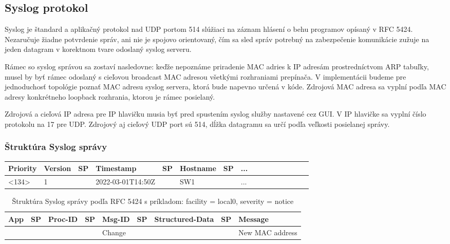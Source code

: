 \documentclass[12pt, a4paper]{article}
\begin{document}
\subsection{Syslog protokol}
Syslog je štandard a aplikačný protokol nad UDP portom 514 slúžiaci na záznam hlásení o behu programov opísaný v RFC 5424.
Nezaručuje žiadne potvrdenie správ, ani nie je spojovo orientovaný, čím sa sled správ potrebný na zabezpečenie
komunikácie zužuje na jeden datagram v korektnom tvare odoslaný syslog serveru.

Rámec so syslog správou sa zostaví nasledovne: keďže nepoznáme priradenie MAC adries k IP adresám prostredníctvom ARP tabuľky, musel by 
byť rámec odoslaný s cieľovou broadcast MAC adresou všetkými rozhraniami prepínača. V implementácii budeme pre jednoduchosť topológie
poznať MAC adresu syslog servera, ktorá bude napevno určená v kóde. Zdrojová MAC adresa sa vyplní podľa MAC adresy konkrétneho loopback rozhrania, ktorou je rámec posielaný.

Zdrojová a cieľová IP adresa pre IP hlavičku musia byť pred spustením syslog služby nastavené cez GUI. V IP hlavičke sa vyplní
číslo protokolu na 17 pre UDP. Zdrojový aj cieľový UDP port sú 514, dĺžka datagramu sa určí podľa veľkosti posielanej správy.

\subsubsection{Štruktúra Syslog správy}
\begin{table}[]
\begin{tabular}{|l|l|l|l|l|l|l|l|l|l|l|l|l|l|l|l|}
\hline
\textbf{Priority}            & \textbf{Version} & \textbf{SP} & \textbf{Timestamp} & \textbf{SP} & \textbf{Hostname} & \textbf{SP} & ... \\ \hline
\textless{}134\textgreater{} & 1       & \textvisiblespace   & 2022-03-01T14:50Z &  \textvisiblespace  & SW1      & \textvisiblespace   & ...     \\ \hline
\end{tabular}
\end{table}

\begin{table}[]
\begin{tabular}{|l|l|l|l|l|l|l|l|l|}
\hline
\textbf{App} & \textbf{SP} & \textbf{Proc-ID} & \textbf{SP} & \textbf{Msg-ID} & \textbf{SP} & \textbf{Structured-Data} & \textbf{SP} & \textbf{Message} \\ \hline
          \textvisiblespace        &    \textvisiblespace         &      \textvisiblespace            &    \textvisiblespace         & Change          &             &                          &             & New MAC address             \\ \hline
\end{tabular}
\caption{Štruktúra Syslog správy podľa RFC 5424 s príkladom: facility = local0, severity = notice}
\end{table}
\end{document}
